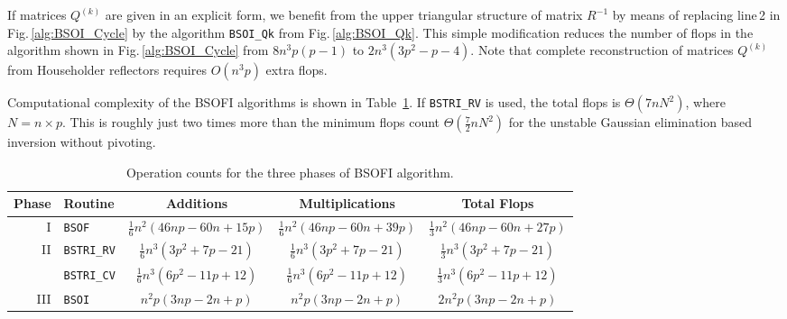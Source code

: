\documentclass{llncs}
\begin{document}
If matrices $Q^{(k)}$ are given in an explicit form,
we benefit from the upper triangular structure of matrix $R^{-1}$
by means of replacing line\,2 %
in Fig.\,\ref{alg:BSOI_Cycle} 
by the algorithm {\tt BSOI\_Qk} from Fig.\,\ref{alg:BSOI_Qk}.
This simple modification reduces the number of flops 
in the algorithm shown in Fig.\,\ref{alg:BSOI_Cycle}
from $8n^3 p (p - 1)$ to $2 n^3 (3 p^2 - p - 4)$.
Note that complete reconstruction of matrices $Q^{(k)}$ 
from Householder reflectors
requires 
$O(n^3 p)$
extra flops.

{Computational complexity}
of the BSOFI algorithms is shown in Table~\ref{tab:developed_routines_complexity}.
If {\tt BSTRI\_RV} is used, 
the total flops is $\Theta(7 n N^2)$, where $N=n{\times}p$.
This is roughly just two times more than the 
minimum flops count $\Theta(\frac{7}{2} n  N^2)$
for the unstable Gaussian elimination based inversion 
without pivoting.

\begin{table}[t]%
  \caption[]{Operation counts for the three phases of BSOFI algorithm.\footnotemark} 
  \label{tab:developed_routines_complexity}
  \begin{tabular}{r|l|c|c|c}
    \toprule
    Phase & Routine & Additions & Multiplications & Total Flops  \\
    \hline\hline %
    I&{\tt BSOF} & 
    $\frac{1}{6} n^{2} \left(46 n p - 60 n + 15 p\right)$
    & $\frac{1}{6} n^{2} \left(46 n p - 60 n + 39 p\right)$
    & $\frac{1}{3} n^{2} \left(46 n p - 60 n + 27 p\right)$\\
    \hline
    II&{\tt BSTRI\_RV} & 
    $\frac{1}{6} n^3 \left(3 p^{2} + 7 p - 21\right)$
    & $\frac{1}{6} n^3 \left(3 p^{2} + 7 p - 21\right)$
    & $\frac{1}{3} n^3 \left(3 p^{2} + 7 p - 21\right)$\\
    \cline{2-5}
    &{\tt BSTRI\_CV} & 
    $\frac{1}{6} n^3 \left(6 p^{2} - 11 p + 12\right)$
    & $\frac{1}{6} n^3 \left(6 p^{2} - 11 p + 12\right)$
    & $\frac{1}{3} n^3 \left(6 p^{2} - 11 p + 12\right)$\\
    \hline
    III&{\tt BSOI} & 
    $n^{2} p \left(3 n p - 2 n + p\right)$
    & $n^2 p \left(3 n p - 2 n + p\right)$
    & $2 n^2 p \left(3 n p - 2 n + p\right)$\\
    \bottomrule  
  \end{tabular}
\end{table}
\end{document}
